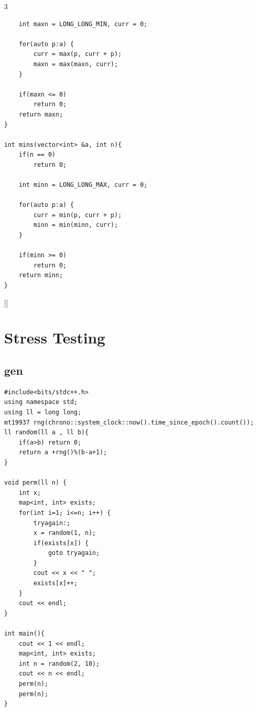 \documentclass[twoside]{article}
\begin{document}
\begin{multicols*}{3}
\begin{verbatim}
    int maxn = LONG_LONG_MIN, curr = 0;

    for(auto p:a) {
        curr = max(p, curr + p); 
        maxn = max(maxn, curr);   
    }

    if(maxn <= 0)
        return 0;
    return maxn;
}

int mins(vector<int> &a, int n){
    if(n == 0)
        return 0;

    int minn = LONG_LONG_MAX, curr = 0;

    for(auto p:a) {
        curr = min(p, curr + p); 
        minn = min(minn, curr);   
    }

    if(minn >= 0)
        return 0;
    return minn;
}
\end{verbatim}

{
[\vspace{2em}]
\section*{Stress Testing}
}
{
\subsection*{gen}
}
\begin{verbatim}
#include<bits/stdc++.h>
using namespace std;
using ll = long long;
mt19937 rng(chrono::system_clock::now().time_since_epoch().count());
ll random(ll a , ll b){
    if(a>b) return 0;
    return a +rng()%(b-a+1);
}

void perm(ll n) {
    int x;
    map<int, int> exists;
    for(int i=1; i<=n; i++) {
        tryagain:;
        x = random(1, n);
        if(exists[x]) {
            goto tryagain;
        }
        cout << x << " ";
        exists[x]++;
    }
    cout << endl;
}

int main(){
    cout << 1 << endl;
    map<int, int> exists;
    int n = random(2, 10);
    cout << n << endl;
    perm(n);
    perm(n);
}
\end{verbatim}


\end{multicols*}
\end{document}
